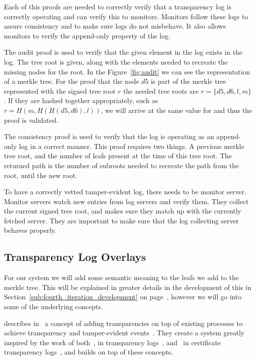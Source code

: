 \documentclass[../Main/thesis.tex]{subfiles}
\begin{document}
Each of this proofs are needed to correctly verify that a transparency log
is correctly operating and can verify this to monitors.  Monitors follow
these logs to assure consistency and to make sure logs do not misbehave. It
also allows monitors to verify the append-only property of the log.

The audit proof is used to verify that the given element in the log exists
in the log. The tree root is given, along with the elements needed to
recreate the missing nodes for the root. In the Figure~\ref{fig:audit} we can
see the representation of a merkle tree. For the proof that the node $ d5 $ is
part of the merkle tree represented with the signed tree root $ r $ the needed
tree roots are $ r = \{ d5, d6, l, m \} $. If they are hashed together
appropriately, such as $ r = H( m, H( H(d5, d6), l)) $, we will arrive at the
same value for and thus the proof is validated.

The consistency proof is used to verify that the log is operating as an
append-only log in a correct manner. This proof requires two things. A
previous merkle tree root, and the number of leafs present at the time of
this tree root. The returned path is the number of subroots needed to
recreate the path from the root, until the new root.

To have a correctly vetted tamper-evident log, there needs to be monitor server.
Monitor servers watch new entries from log servers and verify them. They collect
the current signed tree root, and makes sure they match up with the currently
fetched server. They are important to make sure that the log collecting server
behaves properly.

\subsection*{Transparency Log Overlays}%
\label{sub:transparency_log_overlays}
For our system we will add some semantic meaning to the leafs we add to the
merkle tree. This will be explained in greater details in the development of
this in Section~\ref{sub:fourth_iteration_development} on
page~\pageref{sub:fourth_iteration_development}, however we will go into some of
the underlying concepts.

\citeauthor{10.11452976749.2978404} describes
in~ a concept of adding transparencies on top
of existing processes to achieve transparency and tamper-evident
events~\cite{10.11452976749.2978404}. They create a system greatly inspired by
the work of both~\citeauthor{182788}, in transparency logs~\cite{182788},
and~\citeauthor{b.-laurie-a.-langley-e.kaster-google-2013} in certificate
transparency logs~\cite{b.-laurie-a.-langley-e.kaster-google-2013}, and builds
on top of these concepts.
\end{document}
